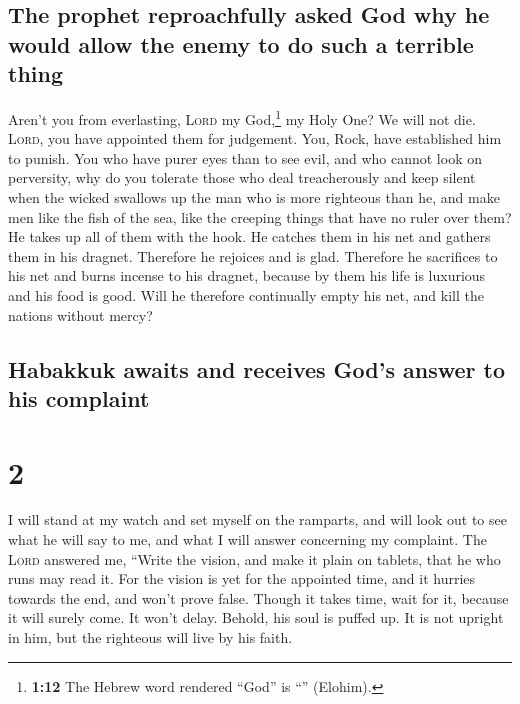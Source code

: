 \hypertarget{the-prophet-reproachfully-asked-god-why-he-would-allow-the-enemy-to-do-such-a-terrible-thing}{%
\subsection{The prophet reproachfully asked God why he would allow the
enemy to do such a terrible
thing}\label{the-prophet-reproachfully-asked-god-why-he-would-allow-the-enemy-to-do-such-a-terrible-thing}}

 Aren't you from everlasting, \textsc{Lord} my
God,\footnote{\textbf{1:12} The Hebrew word rendered ``God'' is
  ``'' (Elohim).} my Holy One? We will not die.
\textsc{Lord}, you have appointed them for judgement. You, Rock, have
established him to punish.  You who have purer eyes than
to see evil, and who cannot look on perversity, why do you tolerate
those who deal treacherously and keep silent when the wicked swallows up
the man who is more righteous than he,  and make men like
the fish of the sea, like the creeping things that have no ruler over
them?  He takes up all of them with the hook. He catches
them in his net and gathers them in his dragnet. Therefore he rejoices
and is glad.  Therefore he sacrifices to his net and
burns incense to his dragnet, because by them his life is luxurious and
his food is good.  Will he therefore continually empty
his net, and kill the nations without mercy?

\hypertarget{habakkuk-awaits-and-receives-gods-answer-to-his-complaint}{%
\subsection{Habakkuk awaits and receives God's answer to his
complaint}\label{habakkuk-awaits-and-receives-gods-answer-to-his-complaint}}

\hypertarget{section-1}{%
\section{2}\label{section-1}}

 I will stand at my watch and set myself on the ramparts,
and will look out to see what he will say to me, and what I will answer
concerning my complaint.  The \textsc{Lord} answered me,
``Write the vision, and make it plain on tablets, that he who runs may
read it.  For the vision is yet for the appointed time,
and it hurries towards the end, and won't prove false. Though it takes
time, wait for it, because it will surely come. It won't delay.
 Behold, his soul is puffed up. It is not upright in him,
but the righteous will live by his faith.

